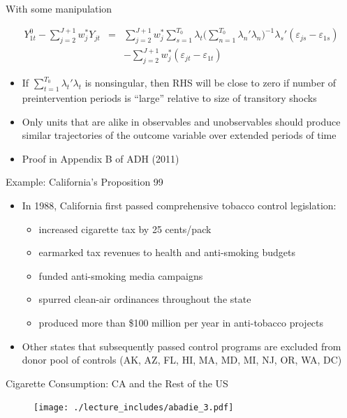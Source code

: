\documentclass{beamer}
\begin{document}
\begin{frame}{With some manipulation}

\begin{eqnarray*}
Y^0_{1t} - \sum^{J+1}_{j=2}w^*_jY_{jt} &=& \sum_{j=2}^{J+1} w_j^* \sum_{s=1}^{T_0} \lambda_t \bigg ( \sum_{n=1}^{T_0} \lambda_n'\lambda_n \bigg )
^{-1} \lambda_s'(\varepsilon_{js} - \varepsilon_{1s} ) \\
&& - \sum_{j=2}^{J+1} w_j^* (\varepsilon_{jt} - \varepsilon_{1t})
\end{eqnarray*}

\begin{itemize}
\item If $\sum_{t=1}^{T_0} \lambda_t' \lambda_t$ is nonsingular, then RHS will be close to zero if number of preintervention periods is ``large''  relative to size of transitory shocks 
\item Only units that are alike in observables and unobservables should produce similar trajectories of the outcome variable over extended periods of time
\item Proof in Appendix B of ADH (2011)
\end{itemize}


\end{frame}


\begin{frame}{Example: California's Proposition 99}
	
	\begin{itemize}
	\item In 1988, California first passed comprehensive tobacco control legislation:
		\begin{itemize}
		\item increased cigarette tax by 25 cents/pack
		\item earmarked tax revenues to health and anti-smoking budgets
		\item funded anti-smoking media campaigns
		\item spurred clean-air ordinances throughout the state
		\item produced more than \$100 million per year in anti-tobacco projects
		\end{itemize}
	\item Other states that subsequently passed control programs are excluded from donor pool of controls (AK, AZ, FL, HI, MA, MD, MI, NJ, OR, WA, DC)
	\end{itemize}
\end{frame}

\begin{frame}{Cigarette Consumption: CA and the Rest of the US}
	
	\begin{figure}
	\texttt{[image: ./lecture\_includes/abadie\_3.pdf]}
	\end{figure}
\end{frame}
\end{document}
